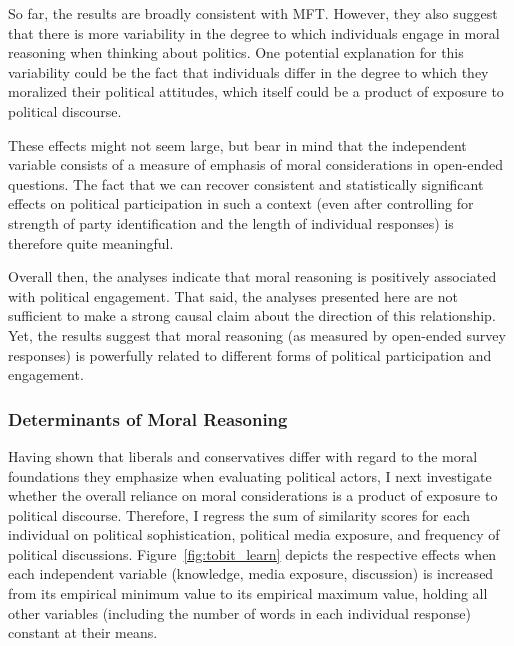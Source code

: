 \documentclass[12pt]{article}
\begin{document}
So far, the results are broadly consistent with MFT. However, they also suggest that there is more variability in the degree to which individuals engage in moral reasoning when thinking about politics. One potential explanation for this variability could be the fact that individuals differ in the degree to which they moralized their political attitudes, which itself could be a product of exposure to political discourse.

These effects might not seem large, but bear in mind that the independent variable consists of a measure of emphasis of moral considerations in open-ended questions. The fact that we can recover consistent and statistically significant effects on political participation in such a context (even after controlling for strength of party identification and the length of individual responses) is therefore quite meaningful.

Overall then, the analyses indicate that moral reasoning is positively associated with political engagement. That said, the analyses presented here are not sufficient to make a strong causal claim about the direction of this relationship. Yet, the results suggest that moral reasoning (as measured by open-ended survey responses) is powerfully related to different forms of political participation and engagement.



\subsubsection{Determinants of Moral Reasoning}

Having shown that liberals and conservatives differ with regard to the moral foundations they emphasize when evaluating political actors, I next investigate whether the overall reliance on moral considerations is a product of exposure to political discourse. Therefore, I regress the sum of similarity scores for each individual on political sophistication, political media exposure, and frequency of political discussions. Figure~\ref{fig:tobit_learn} depicts the respective effects when each independent variable (knowledge, media exposure, discussion) is increased from its empirical minimum value to its empirical maximum value, holding all other variables (including the number of words in each individual response) constant at their means.
\end{document}
